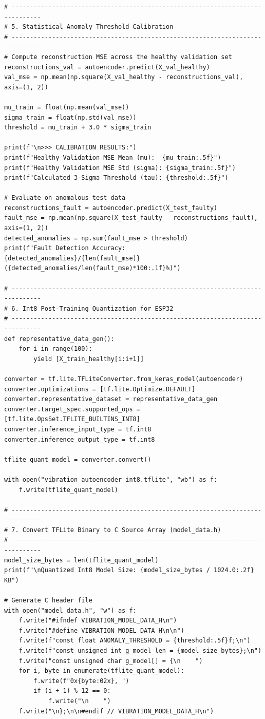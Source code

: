 \begin{lstlisting}[style=pythonstyle, caption={Complete Autoencoder Training, Threshold Calibration, and Int8 Quantization Pipeline.}, label={lst:autoencoder_pipeline}]
# ------------------------------------------------------------------------------
# 5. Statistical Anomaly Threshold Calibration
# ------------------------------------------------------------------------------
# Compute reconstruction MSE across the healthy validation set
reconstructions_val = autoencoder.predict(X_val_healthy)
val_mse = np.mean(np.square(X_val_healthy - reconstructions_val), axis=(1, 2))

mu_train = float(np.mean(val_mse))
sigma_train = float(np.std(val_mse))
threshold = mu_train + 3.0 * sigma_train

print(f"\n>>> CALIBRATION RESULTS:")
print(f"Healthy Validation MSE Mean (mu):  {mu_train:.5f}")
print(f"Healthy Validation MSE Std (sigma): {sigma_train:.5f}")
print(f"Calculated 3-Sigma Threshold (tau): {threshold:.5f}")

# Evaluate on anomalous test data
reconstructions_fault = autoencoder.predict(X_test_faulty)
fault_mse = np.mean(np.square(X_test_faulty - reconstructions_fault), axis=(1, 2))
detected_anomalies = np.sum(fault_mse > threshold)
print(f"Fault Detection Accuracy: {detected_anomalies}/{len(fault_mse)} ({detected_anomalies/len(fault_mse)*100:.1f}%)")

# ------------------------------------------------------------------------------
# 6. Int8 Post-Training Quantization for ESP32
# ------------------------------------------------------------------------------
def representative_data_gen():
    for i in range(100):
        yield [X_train_healthy[i:i+1]]

converter = tf.lite.TFLiteConverter.from_keras_model(autoencoder)
converter.optimizations = [tf.lite.Optimize.DEFAULT]
converter.representative_dataset = representative_data_gen
converter.target_spec.supported_ops = [tf.lite.OpsSet.TFLITE_BUILTINS_INT8]
converter.inference_input_type = tf.int8
converter.inference_output_type = tf.int8

tflite_quant_model = converter.convert()

with open("vibration_autoencoder_int8.tflite", "wb") as f:
    f.write(tflite_quant_model)

# ------------------------------------------------------------------------------
# 7. Convert TFLite Binary to C Source Array (model_data.h)
# ------------------------------------------------------------------------------
model_size_bytes = len(tflite_quant_model)
print(f"\nQuantized Int8 Model Size: {model_size_bytes / 1024.0:.2f} KB")

# Generate C header file
with open("model_data.h", "w") as f:
    f.write("#ifndef VIBRATION_MODEL_DATA_H\n")
    f.write("#define VIBRATION_MODEL_DATA_H\n\n")
    f.write(f"const float ANOMALY_THRESHOLD = {threshold:.5f}f;\n")
    f.write(f"const unsigned int g_model_len = {model_size_bytes};\n")
    f.write("const unsigned char g_model[] = {\n    ")
    for i, byte in enumerate(tflite_quant_model):
        f.write(f"0x{byte:02x}, ")
        if (i + 1) % 12 == 0:
            f.write("\n    ")
    f.write("\n};\n\n#endif // VIBRATION_MODEL_DATA_H\n")


\end{lstlisting}
